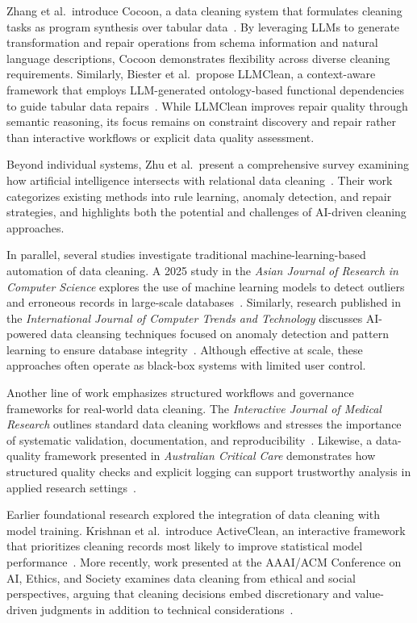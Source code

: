 \documentclass[conference]{IEEEtran}
\begin{document}
Zhang et al.\ introduce Cocoon, a data cleaning system that formulates cleaning tasks as program synthesis over tabular data~\cite{ref2}. By leveraging LLMs to generate transformation and repair operations from schema information and natural language descriptions, Cocoon demonstrates flexibility across diverse cleaning requirements. Similarly, Biester et al.\ propose LLMClean, a context-aware framework that employs LLM-generated ontology-based functional dependencies to guide tabular data repairs~\cite{ref3}. While LLMClean improves repair quality through semantic reasoning, its focus remains on constraint discovery and repair rather than interactive workflows or explicit data quality assessment.

Beyond individual systems, Zhu et al.\ present a comprehensive survey examining how artificial intelligence intersects with relational data cleaning~\cite{ref4}. Their work categorizes existing methods into rule learning, anomaly detection, and repair strategies, and highlights both the potential and challenges of AI-driven cleaning approaches.

In parallel, several studies investigate traditional machine-learning-based automation of data cleaning. A 2025 study in the \textit{Asian Journal of Research in Computer Science} explores the use of machine learning models to detect outliers and erroneous records in large-scale databases~\cite{ref5}. Similarly, research published in the \textit{International Journal of Computer Trends and Technology} discusses AI-powered data cleansing techniques focused on anomaly detection and pattern learning to ensure database integrity~\cite{ref6}. Although effective at scale, these approaches often operate as black-box systems with limited user control.

Another line of work emphasizes structured workflows and governance frameworks for real-world data cleaning. The \textit{Interactive Journal of Medical Research} outlines standard data cleaning workflows and stresses the importance of systematic validation, documentation, and reproducibility~\cite{ref7}. Likewise, a data-quality framework presented in \textit{Australian Critical Care} demonstrates how structured quality checks and explicit logging can support trustworthy analysis in applied research settings~\cite{ref8}.

Earlier foundational research explored the integration of data cleaning with model training. Krishnan et al.\ introduce ActiveClean, an interactive framework that prioritizes cleaning records most likely to improve statistical model performance~\cite{ref9}. More recently, work presented at the AAAI/ACM Conference on AI, Ethics, and Society examines data cleaning from ethical and social perspectives, arguing that cleaning decisions embed discretionary and value-driven judgments in addition to technical considerations~\cite{ref10}.
\end{document}
